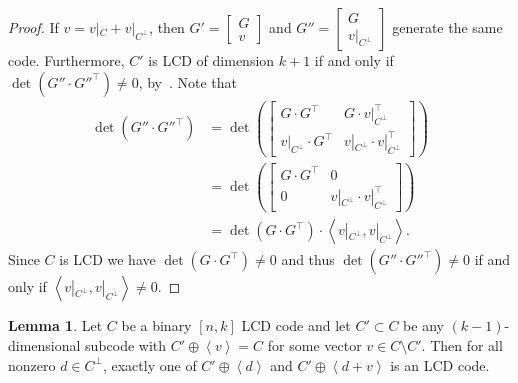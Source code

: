 \documentclass[11pt]{article}
\theoremstyle{definition}
\newtheorem{lemma}[theorem]{Lemma}
\newcommand{\Ang}[1]{\left\langle#1\right\rangle}
\begin{document}
\begin{proof}
	If $v = v|_C + v|_{C^{\perp}}$, then $G' = \begin{bmatrix}
			G \\
			v
		\end{bmatrix}$ and $G'' = \begin{bmatrix}
			G \\
			v|_{C^{\perp}}
		\end{bmatrix}$ generate the same code.
	Furthermore,
	$C'$ is LCD of dimension $k + 1$ if and only if $\det(G'' \cdot G''^\top) \neq 0$, by~\cite[Theorem 2.1]{Mas92}.
	Note that
	\begin{align*}
		\det(G'' \cdot G''^\top)
		&= \det\left( \begin{bmatrix}
			G \cdot G^\top & G \cdot v|_{C^{\perp}}^\top \\
			v|_{C^{\perp}} \cdot G^\top & v|_{C^{\perp}} \cdot v|_{C^{\perp}}^\top
		\end{bmatrix}\right) \\
		&= \det\left( \begin{bmatrix}
			G \cdot G^\top & 0 \\
			 0 &  v|_{C^{\perp}} \cdot v|_{C^{\perp}}^\top
		\end{bmatrix}\right) \\
		&= \det(G \cdot G^\top) \cdot \Ang{v|_{C^{\perp}}, v|_{C^{\perp}}}.
	\end{align*}
	Since $C$ is LCD we have $\det(G \cdot G^\top) \neq 0$ and thus $\det(G'' \cdot G''^\top) \neq 0$ if and only if $\Ang{v|_{C^{\perp}}, v|_{C^{\perp}}} \neq 0$.
\end{proof}

\begin{lemma}\label{lem:half-neighbors}
	Let $C$ be a binary $[n, k]$ LCD code and let $C' \subset C$ be any $(k - 1)$-dimensional subcode with $C' \oplus \Ang{v} = C$ for some vector $v \in C \setminus C'$.
	Then for all nonzero $d \in C^\perp$, exactly one of $C' \oplus \Ang{d}$ and $C' \oplus \Ang{d + v}$ is an LCD code.
\end{lemma}
\end{document}
